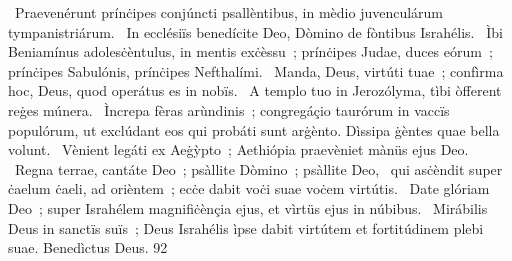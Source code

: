 {~Praevenérunt prínċipes conjúncti psallèntibus, in mèdio juvenculárum tympanistriárum.
~In ecclésiïs benedícite Deo, Dòmino de fòntibus Israhélis.
~Ìbi Beniamínus adolesċèntulus, in mentis exċèssu~; prínċipes Judae, duces eórum~; prínċipes Sabulónis, prínċipes Nefthalími.
~Manda, Deus, virtúti tuae~; confìrma hoc, Deus, quod operátus es in nobïs.
~A templo tuo in Jerozólyma, tìbi òfferent reġes múnera.
~Ìncrepa fèras arùndinis~; congregáçio taurórum in vaccïs populórum, ut exclúdant eos qui probáti sunt arġènto. Dìssipa ġèntes quae bella volunt.
~Vènient legáti ex Aeġỳpto~; Aethiópia praevèniet mànüs ejus Deo.
~Regna terrae, cantáte Deo~; psàllite Dòmino~; psàllite Deo,
~qui asċèndit super ċaelum ċaeli, ad orièntem~; ecċe dabit voċi suae voċem virtútis.
~Date glóriam Deo~; super Israhélem magnifiċènçia ejus, et vìrtüs ejus in núbibus.
~Mirábilis Deus in sanctïs suïs~; Deus Israhélis ìpse dabit virtútem et fortitúdinem plebi suae. Benedìctus Deus.
}
{9}{2}
